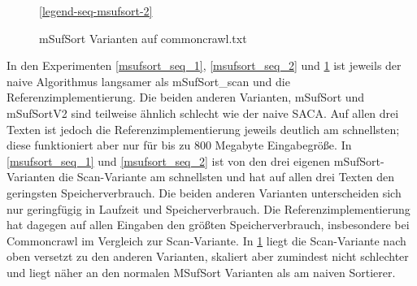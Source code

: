 \begin{figure}[ht]

    \medskip
    \ref{legend-seq-msufsort-2}
    \caption{mSufSort Varianten auf commoncrawl.txt}
	\label{msufsort_seq_3}
\end{figure}
\FloatBarrier

In den Experimenten \ref{msufsort_seq_1}, \ref{msufsort_seq_2} und \ref{msufsort_seq_3} ist jeweils der naive Algorithmus langsamer als mSufSort_scan und die Referenzimplementierung. Die beiden anderen Varianten, mSufSort und mSufSortV2 sind teilweise ähnlich schlecht wie der naive SACA. Auf allen drei Texten ist jedoch die Referenzimplementierung jeweils deutlich am schnellsten; diese funktioniert aber nur für bis zu 800 Megabyte Eingabegröße. In \ref{msufsort_seq_1} und \ref{msufsort_seq_2} ist von den drei eigenen mSufSort-Varianten die Scan-Variante am schnellsten und hat auf allen drei Texten den geringsten Speicherverbrauch.
Die beiden anderen Varianten unterscheiden sich nur geringfügig in Laufzeit und Speicherverbrauch. Die Referenzimplementierung hat dagegen auf allen Eingaben den größten Speicherverbrauch, insbesondere bei Commoncrawl im Vergleich zur Scan-Variante.
In \ref{msufsort_seq_3} liegt die Scan-Variante nach oben versetzt zu den anderen Varianten,
skaliert aber zumindest nicht schlechter und liegt näher an den normalen MSufSort Varianten als am naiven Sortierer.
